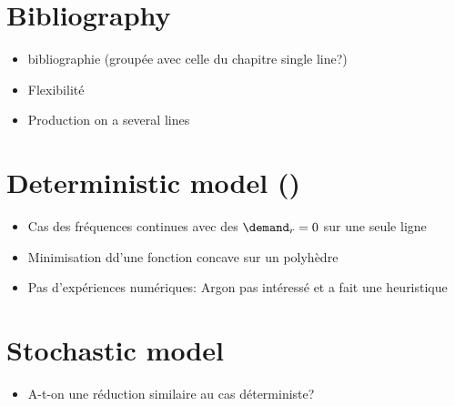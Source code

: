 \section{Bibliography}

\begin{itemize}
  \item bibliographie (groupée avec celle du chapitre single line?)
  \item Flexibilité
  \item Production on a several lines
\end{itemize}




\section{Deterministic model (\tbc)}

\begin{itemize}
  \item Cas des fréquences continues avec des $\demand_r=0$ sur une seule ligne
  \item Minimisation dd'une fonction concave sur un polyhèdre
  \item Pas d'expériences numériques: Argon pas intéressé et a fait une heuristique
\end{itemize}



\section{Stochastic model}


\begin{itemize}
  \item A-t-on une réduction similaire au cas déterministe? \tbc
\end{itemize}

